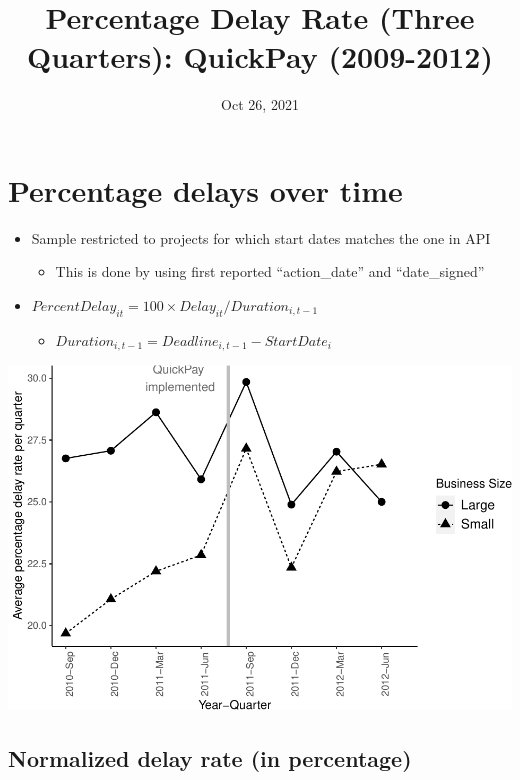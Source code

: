 \documentclass[
]{article}
\title{Percentage Delay Rate (Three Quarters): QuickPay (2009-2012)}
\author{}
\date{\vspace{-2.5em}Oct 26, 2021}
\providecommand{\tightlist}{%
  \setlength{\itemsep}{0pt}\setlength{\parskip}{0pt}}
\begin{document}
\maketitle

\hypertarget{percentage-delays-over-time}{%
\section{Percentage delays over
time}\label{percentage-delays-over-time}}

\begin{itemize}
\tightlist
\item
  Sample restricted to projects for which start dates matches the one in
  API

  \begin{itemize}
  \tightlist
  \item
    This is done by using first reported ``action\_date'' and
    ``date\_signed''
  \end{itemize}
\item
  \(PercentDelay_{it}=100 \times Delay_{it}/Duration_{i,t-1}\)

  \begin{itemize}
  \tightlist
  \item
    \(Duration_{i,t-1} = Deadline_{i,t-1} - StartDate_i\)
  \end{itemize}
\end{itemize}

\includegraphics{qp_first_pc_delay_three_quarters_files/figure-latex/plot_pc_delay-1.pdf}

\hypertarget{normalized-delay-rate-in-percentage}{%
\subsection{Normalized delay rate (in
percentage)}\label{normalized-delay-rate-in-percentage}}
\end{document}
